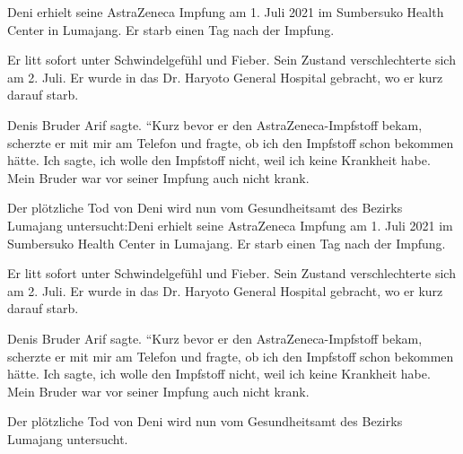Deni erhielt seine AstraZeneca Impfung am 1. Juli 2021 im Sumbersuko Health
Center in Lumajang. Er starb einen Tag nach der Impfung.

Er litt sofort unter Schwindelgefühl und Fieber. Sein Zustand verschlechterte
sich am 2. Juli. Er wurde in das Dr. Haryoto General Hospital gebracht, wo er
kurz darauf starb.

Denis Bruder Arif sagte. ``Kurz bevor er den AstraZeneca-Impfstoff bekam,
scherzte er mit mir am Telefon und fragte, ob ich den Impfstoff schon bekommen
hätte. Ich sagte, ich wolle den Impfstoff nicht, weil ich keine Krankheit
habe. Mein Bruder war vor seiner Impfung auch nicht krank.

Der plötzliche Tod von Deni wird nun vom Gesundheitsamt des Bezirks Lumajang
untersucht:Deni erhielt seine AstraZeneca Impfung am 1. Juli 2021 im Sumbersuko
Health Center in Lumajang. Er starb einen Tag nach der Impfung.

Er litt sofort unter Schwindelgefühl und Fieber. Sein Zustand verschlechterte
sich am 2. Juli. Er wurde in das Dr. Haryoto General Hospital gebracht, wo er
kurz darauf starb.

Denis Bruder Arif sagte. ``Kurz bevor er den AstraZeneca-Impfstoff bekam,
scherzte er mit mir am Telefon und fragte, ob ich den Impfstoff schon bekommen
hätte. Ich sagte, ich wolle den Impfstoff nicht, weil ich keine Krankheit
habe. Mein Bruder war vor seiner Impfung auch nicht krank.

Der plötzliche Tod von Deni wird nun vom Gesundheitsamt des Bezirks Lumajang
untersucht.
